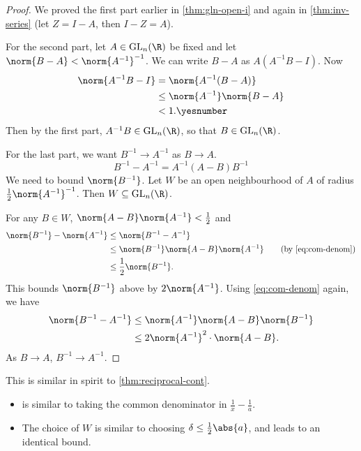 \begin{proof}
    We proved the first part earlier in \cref{thm:gln-open-i} and again
    in \cref{thm:inv-series}
    (let $Z = I - A$, then $I - Z = A$).

    For the second part, let $A \in \GL_n(\R)$ be fixed and
    let $\norm{B - A} < {\norm{A^{-1}}}^{-1}$.
    We can write $B - A$ as $A(A^{-1}B - I)$.
    Now \begin{align*}
        \norm{A^{-1}B - I} &= \norm{A^{-1} (B - A)} \\
        &\leq \norm{A^{-1}} \norm{B - A} \\
        &< 1. \yesnumber \label{eq:god}
    \end{align*}
    Then by the first part, $A^{-1}B \in \GL_n(\R)$, so that
    $B \in \GL_n(\R)$.

    For the last part, we want $B^{-1} \to A^{-1}$ as $B \to A$.
    \begin{equation}
        B^{-1} - A^{-1} = A^{-1}(A - B)B^{-1} \label{eq:com-denom}
    \end{equation}
    We need to bound $\norm{B^{-1}}$.
    Let $W$ be an open neighbourhood of $A$ of radius
    $\frac12 \norm{A^{-1}}^{-1}$.
    Then $W \subseteq \GL_n(\R)$.

    For any $B \in W$, $\norm{A - B} \norm{A^{-1}} < \frac12$
    and \begin{align*}
        \norm{B^{-1}} - \norm{A^{-1}}
            &\le \norm{B^{-1} - A^{-1}} \\
            &\le \norm{B^{-1}} \norm{A - B} \norm{A^{-1}}
                \tag{by \cref{eq:com-denom}} \\
            &\le \frac12 \norm{B^{-1}}.
    \end{align*}
    This bounds $\norm{B^{-1}}$ above by $2\norm{A^{-1}}$.
    Using \cref{eq:com-denom} again, we have \begin{align*}
        \norm{B^{-1} - A^{-1}}
            &\le \norm{A^{-1}} \norm{A - B} \norm{B^{-1}} \\
            &\le 2 {\norm{A^{-1}}}^2 \cdot \norm{A - B}.
    \end{align*}
    As $B \to A$, $B^{-1} \to A^{-1}$.
\end{proof}
\begin{idea}
    This is similar in spirit to \cref{thm:reciprocal-cont}.
    \begin{itemize}
        \item {} is similar to taking the common
        denominator in $\frac1x - \frac1a$.
        \item The choice of $W$ is similar to choosing
        $\delta \le \frac12\abs{a}$, and leads to an identical bound.
    \end{itemize}
\end{idea}

